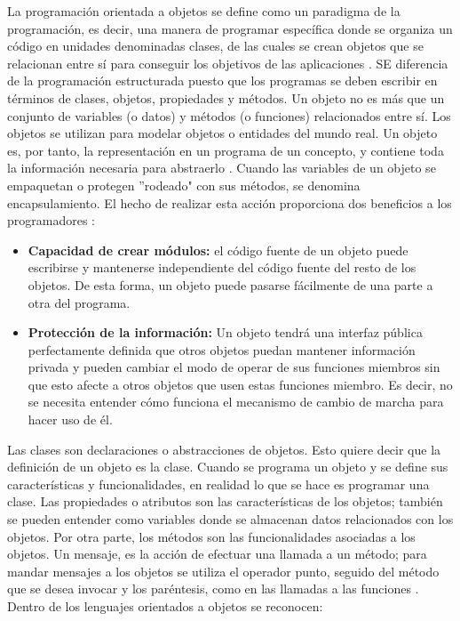 La programación orientada a objetos se define como un paradigma de la programación, es decir, una manera de programar específica donde se organiza un código en unidades denominadas clases, de las cuales se crean objetos que se relacionan entre sí para conseguir los objetivos de las aplicaciones \citep{alvarez2019}. SE diferencia de la programación estructurada puesto que los programas se deben escribir en términos de clases, objetos, propiedades y métodos.
Un objeto no es más que un conjunto de variables (o datos) y métodos (o funciones) relacionados entre sí. Los objetos se utilizan para modelar objetos o entidades del mundo real. Un objeto es, por tanto, la representación en un programa de un concepto, y contiene toda la información necesaria para abstraerlo \citep{izquierdo2013}. Cuando las variables de un objeto se empaquetan o protegen ''rodeado" con sus métodos, se denomina encapsulamiento. El hecho de realizar esta acción proporciona dos beneficios a los programadores \citep{izquierdo2013}:
\begin{itemize}
\item \textbf{Capacidad de crear módulos:} el código fuente de un objeto puede escribirse y mantenerse independiente del código fuente del resto de los objetos. De esta forma, un objeto puede pasarse fácilmente de una parte a otra del programa.
\item \textbf{Protección de la información:} Un objeto tendrá una interfaz pública perfectamente definida que otros objetos puedan mantener información privada y pueden cambiar el modo de operar de sus funciones miembros sin que esto afecte a otros objetos que usen estas funciones miembro. Es decir, no se necesita entender cómo funciona el mecanismo de cambio de marcha para hacer uso de él. 
\end{itemize}

Las clases son declaraciones o abstracciones de objetos. Esto quiere decir que la definición de un objeto es la clase. Cuando se programa un objeto y se define sus características y funcionalidades, en realidad lo que se hace es programar una clase. Las propiedades o atributos son las características de los objetos; también se pueden entender como variables donde se almacenan datos relacionados con los objetos. Por otra parte, los métodos son las funcionalidades asociadas a los objetos. Un mensaje, es la acción de efectuar una llamada a un método; para mandar mensajes a los objetos se utiliza el operador punto, seguido del método que se desea invocar y los paréntesis, como en las llamadas a las funciones \citep{alvarez2019}. Dentro de los lenguajes orientados a objetos se reconocen:

